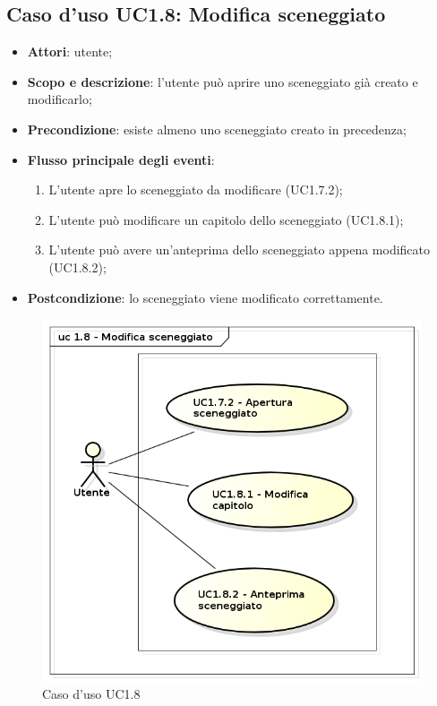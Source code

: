 \subsection{Caso d'uso UC1.8: Modifica sceneggiato}
\label{sec:UC1.8}

\begin{itemize}
\item \textbf{Attori}: utente;
\item \textbf{Scopo e descrizione}: l'utente può aprire uno sceneggiato già creato e modificarlo;
\item \textbf{Precondizione}: esiste almeno uno sceneggiato creato in precedenza;
\item \textbf{Flusso principale degli eventi}:
\begin{enumerate}
\item L'utente apre lo sceneggiato da modificare (UC1.7.2);
\item L'utente può modificare un capitolo dello sceneggiato (UC1.8.1);
\item L'utente può avere un'anteprima dello sceneggiato appena modificato (UC1.8.2);
\end{enumerate}
\item \textbf{Postcondizione}: lo sceneggiato viene modificato correttamente.
\end{itemize}
\begin{figure}[htbp]
\centering
\includegraphics[scale=0.5]{immagini/uc1_8_modifica_sceneggiato.png}
\captionsetup{labelfont=bf}
\caption{Caso d'uso UC1.8}
\end{figure}
\newpage

